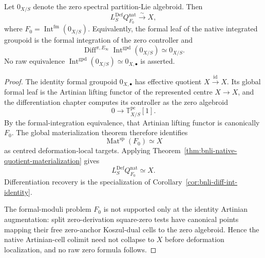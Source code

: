 \begin{proposition}
\label{prop:bnli-zero-integration}
Let $0_{X/S}$ denote the zero spectral partition-Lie algebroid.  Then
\[
\boxed{
    L_S^{\mathrm{Def}}Q^{\mathrm{nat}}_{F_0}
    \xrightarrow{\sim} X,}
\]
where $F_0=\operatorname{Int}^{\mathrm{fm}}(0_{X/S})$.  Equivalently, the
formal leaf of the native integrated groupoid is the formal integration of the
zero controller and
\[
\boxed{
    \operatorname{Diff}^{\pi,E_\infty}
    \operatorname{Int}^{\mathrm{gpd}}(0_{X/S})
    \simeq0_{X/S}.}
\]
No raw equivalence
$\operatorname{Int}^{\mathrm{gpd}}(0_{X/S})\simeq0_{X,\bullet}$ is asserted.
\end{proposition}

\begin{proof}
The identity formal groupoid $0_{X,\bullet}$ has effective quotient
$X\xrightarrow{\mathrm{id}}X$.  Its global formal leaf is the Artinian lifting
functor of the represented centre $X\to X$, and the differentiation chapter
computes its controller as the zero algebroid
\[
    0\longrightarrow\mathbb T^{\mathrm{pc}}_{X/S}[1].
\]
By the formal-integration equivalence, that Artinian lifting functor is
canonically $F_0$.  The global materialization theorem therefore identifies
\[
    \operatorname{Mat}^{\mathrm{sp}}(F_0)\simeq X
\]
as centred deformation-local targets.  Applying
Theorem~\ref{thm:bnli-native-quotient-materialization} gives
\[
    L_S^{\mathrm{Def}}Q^{\mathrm{nat}}_{F_0}
    \simeq X.
\]
Differentiation recovery is the specialization of
Corollary~\ref{cor:bnli-diff-int-identity}.

The formal-moduli problem $F_0$ is not supported only at the identity Artinian
augmentation: split zero-derivation square-zero tests have canonical points
mapping their free zero-anchor Koszul-dual cells to the zero algebroid.  Hence
the native Artinian-cell colimit need not collapse to $X$ before deformation
localization, and no raw zero formula follows.
\end{proof}


